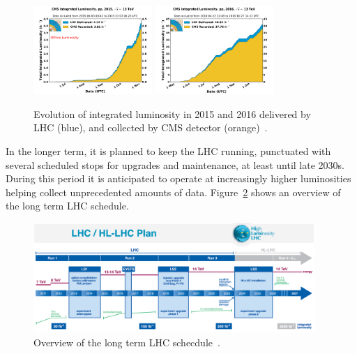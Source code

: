 \begin{figure}
\begin{center}
  \includegraphics[width=0.4\textwidth,keepaspectratio]{plots_and_figures/chapter3/int_lumi_per_day_cumulative_pp_2015.png}
  \includegraphics[width=0.4\textwidth,keepaspectratio]{plots_and_figures/chapter3/int_lumi_per_day_cumulative_pp_2016.png}
\caption{Evolution of integrated luminosity in 2015 and 2016 delivered by LHC (blue), and collected by CMS detector (orange)~\cite{cms_int_lumi_ref}.}
\label{fig:cms_int_lumi}
\end{center}
\end{figure}

In the longer term, it is planned to keep the LHC running, punctuated with several scheduled stops for upgrades and maintenance, at least until late 2030s. During this period it is anticipated to operate at increasingly higher luminosities helping collect unprecedented amounts of data. Figure~\ref{fig:lhc_schedule} shows an overview of the long term LHC schedule. 
\begin{figure}
\begin{center}
  \includegraphics[width=0.95\textwidth,keepaspectratio]{plots_and_figures/chapter3/lhc_schedule.png}
\caption{Overview of the long term LHC schecdule~\cite{LHC_plan_ref}.}
\label{fig:lhc_schedule}
\end{center}
\end{figure}



